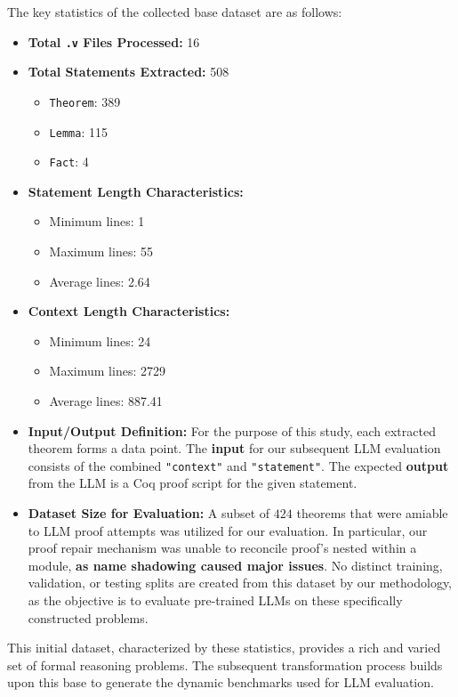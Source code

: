 The key statistics of the collected base dataset are as follows:
\begin{multicols}{2}
  \begin{itemize}
    \item \textbf{Total \texttt{.v} Files Processed:} 16
    \item \textbf{Total Statements Extracted:} 508
    \begin{itemize}
        \item \texttt{Theorem}: 389
        \item \texttt{Lemma}: 115
        \item \texttt{Fact}: 4
    \end{itemize}
    \item \textbf{Statement Length Characteristics:}
    \begin{itemize}
        \item Minimum lines: 1
        \item Maximum lines: 55
        \item Average lines: 2.64
    \end{itemize}
    \item \textbf{Context Length Characteristics:}
    \begin{itemize}
        \item Minimum lines: 24
        \item Maximum lines: 2729
        \item Average lines: 887.41
    \end{itemize}
    \end{itemize}
\end{multicols}
\begin{itemize}
    \item \textbf{Input/Output Definition:} For the purpose of this study, each extracted theorem forms a data point. The \textbf{input} for our subsequent LLM evaluation consists of the combined \texttt{"context"} and \texttt{"statement"}. The expected \textbf{output} from the LLM is a Coq proof script for the given statement.
    \item \textbf{Dataset Size for Evaluation:} A subset of $424$ theorems that were amiable to LLM proof attempts was utilized for our evaluation. In particular, our proof repair mechanism was unable to reconcile proof's nested within a module, \textbf{as name shadowing caused major issues}. No distinct training, validation, or testing splits are created from this dataset by our methodology, as the objective is to evaluate pre-trained LLMs on these specifically constructed problems.
\end{itemize}
This initial dataset, characterized by these statistics, provides a rich and varied set of formal reasoning problems. The subsequent transformation process builds upon this base to generate the dynamic benchmarks used for LLM evaluation.